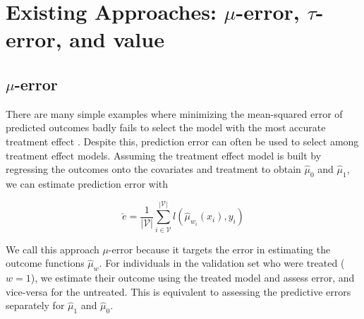 \section{Existing Approaches: $\mu$-error, $\tau$-error, and value}
\label{approaches}

\subsection{$\mu$-error}
\label{sec:pred-error}

There are many simple examples where minimizing the mean-squared error of predicted outcomes badly fails to select the model with the most accurate treatment effect \cite{Rolling:2013kz}. Despite this, prediction error can often be used to select among treatment effect models. Assuming the treatment effect model is built by regressing the outcomes onto the covariates and treatment to obtain $\hat\mu_0$ and $\hat\mu_1$, we can estimate prediction error with

\begin{equation}
	\check e = \frac{1}{|\mathcal{V}|} \sum_{i \in \mathcal{V}}^{|\mathcal{V}|}  
	l(\hat \mu_{w_i} (x_i), y_i) 
\label{pred-error}
\end{equation}
 
We call this approach $\mu$-error because it targets the error in estimating the outcome functions $\hat\mu_w$. For individuals in the validation set who were treated ($w=1$), we estimate their outcome using the treated model and assess error, and vice-versa for the untreated. This is equivalent to assessing the predictive errors separately for $\hat\mu_1$ and $\hat\mu_0$. 


